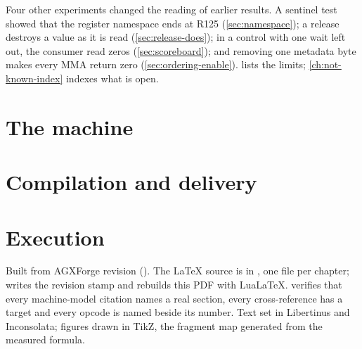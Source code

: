 \documentclass[11pt, letterpaper, oneside, open=any, numbers=noenddot]{scrreprt}
\begin{document}
Four other experiments changed the reading of earlier results. A sentinel test showed that the register namespace ends
at R125 (\cref{sec:namespace}); a release destroys a value as it is read (\cref{sec:release-does}); in a control with one
wait left out, the consumer read zeros (\cref{sec:scoreboard}); and removing one metadata byte makes every MMA return zero
(\cref{sec:ordering-enable}).  lists the limits; \cref{ch:not-known-index} indexes what is open.

\tableofcontents

\setcounter{chapter}{-1}

\part{The machine}\label{part:i}














\part{Compilation and delivery}\label{part:ii}


\part{Execution}\label{part:iii}

\appendix
{}






Built from AGXForge revision \code{\docrevision}\ifx\docrevdate\empty\else{} (\docrevdate)\fi. The \LaTeX{} source is in
, one file per chapter;  writes the revision stamp and rebuilds this PDF with
Lua\LaTeX{}.  verifies that every machine-model citation names a real section, every
cross-reference has a target and every opcode is named beside its number. Text set in Libertinus and Inconsolata;
figures drawn in TikZ, the fragment map generated from the measured formula.
\end{document}
